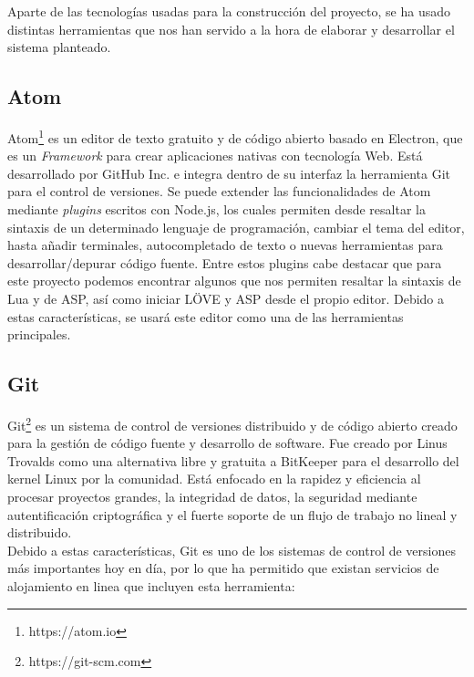 Aparte de las tecnologías usadas para la construcción del proyecto, se ha usado distintas herramientas que nos han servido a la hora de elaborar y desarrollar el sistema planteado.

\subsection{Atom}

Atom\footnote{https://atom.io} es un editor de texto gratuito y de código abierto basado en Electron, que es un \textit{Framework} para crear aplicaciones nativas con tecnología Web. Está desarrollado por GitHub Inc. e integra dentro de su interfaz la herramienta Git para el control de versiones. Se puede extender las funcionalidades de Atom mediante \textit{plugins} escritos con Node.js, los cuales permiten desde resaltar la sintaxis de un determinado lenguaje de programación, cambiar el tema del editor, hasta añadir terminales, autocompletado de texto o nuevas herramientas para desarrollar/depurar código fuente. Entre estos plugins cabe destacar que para este proyecto podemos encontrar algunos que nos permiten resaltar la sintaxis de Lua y de ASP, así como iniciar LÖVE y ASP desde el propio editor. Debido a estas características, se usará este editor como una de las herramientas principales.

\subsection{Git}

Git\footnote{https://git-scm.com} es un sistema de control de versiones distribuido y de código abierto creado para la gestión de código fuente y desarrollo de software. Fue creado por Linus Trovalds como una alternativa libre y gratuita a BitKeeper para el desarrollo del kernel Linux por la comunidad. Está enfocado en la rapidez y eficiencia al procesar proyectos grandes, la integridad de datos, la seguridad mediante autentificación criptográfica y el fuerte soporte de un flujo de trabajo no lineal y distribuido. \\

Debido a estas características, Git es uno de los sistemas de control de versiones más importantes hoy en día, por lo que ha permitido que existan servicios de alojamiento en linea que incluyen esta herramienta:

